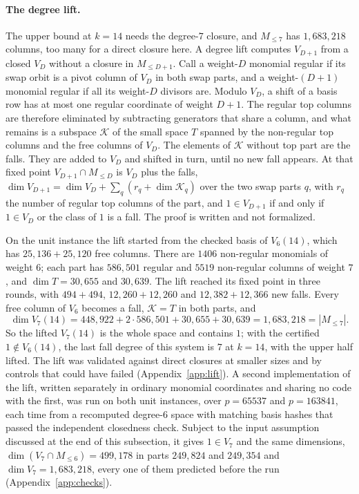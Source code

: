 \documentclass[11pt]{article}
\theoremstyle{definition}\newtheorem{definition}[theorem]{Definition}
\theoremstyle{remark}\newtheorem{remark}[theorem]{Remark}
\begin{document}
\paragraph{The degree lift.}
The upper bound at $k=14$ needs the degree-$7$ closure, and $M_{\le7}$ has
$1{,}683{,}218$ columns, too many for a direct closure here. A degree lift
computes $V_{D+1}$ from a closed $V_D$ without a closure in $M_{\le D+1}$.
Call a weight-$D$ monomial regular if its swap orbit is a pivot column of
$V_D$ in both swap parts, and a weight-$(D+1)$ monomial regular if all its
weight-$D$ divisors are. Modulo $V_D$, a shift of a basis row has at most
one regular coordinate of weight $D+1$. The regular top columns are
therefore eliminated by subtracting generators that share a column, and
what remains is a subspace $\mathcal K$ of the small space $T$ spanned by
the non-regular top columns and the free columns of $V_D$. The elements of
$\mathcal K$ without top part are the falls. They are added to $V_D$ and
shifted in turn, until no new fall appears. At that fixed point
$V_{D+1}\cap M_{\le D}$ is $V_D$ plus the falls,
$\dim V_{D+1}=\dim V_D+\sum_q(r_q+\dim\mathcal K_q)$ over the two swap parts
$q$, with $r_q$ the number of regular top columns of the part, and
$1\in V_{D+1}$ if and only if $1\in V_D$ or the class of $1$ is a fall. The
proof is written and not formalized.

On the unit instance the lift started from the checked basis of $V_6(14)$,
which has $25{,}136+25{,}120$ free columns. There are $1406$ non-regular
monomials of weight $6$; each part has $586{,}501$ regular and $5519$
non-regular columns of weight $7$, and $\dim T=30{,}655$ and $30{,}639$.
The lift reached its fixed point in three rounds, with $494+494$,
$12{,}260+12{,}260$ and $12{,}382+12{,}366$ new falls. Every free column of
$V_6$ becomes a fall, $\mathcal K=T$ in both parts, and
\[
 \dim V_7(14)=448{,}922+2\cdot586{,}501+30{,}655+30{,}639=1{,}683{,}218=|M_{\le7}|.
\]
So the lifted $V_7(14)$ is the whole space and contains $1$; with the
certified $1\notin V_6(14)$, the last fall degree of this system is $7$ at
$k=14$, with the upper half lifted. The lift was validated against direct
closures at smaller sizes and by controls that could have failed
(Appendix~\ref{app:lift}). A second implementation of the lift, written
separately in ordinary monomial coordinates and sharing no code with the
first, was run on both unit instances, over $p=65537$ and $p=163841$, each
time from a recomputed degree-$6$ space with matching basis hashes that
passed the independent closedness check. Subject to the input assumption
discussed at the end of this subsection, it gives $1\in V_7$ and the same
dimensions, $\dim(V_7\cap M_{\le6})=499{,}178$ in parts $249{,}824$ and
$249{,}354$ and $\dim V_7=1{,}683{,}218$, every one of them predicted before
the run (Appendix~\ref{app:checks}).
\end{document}
